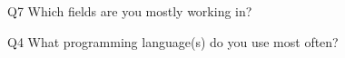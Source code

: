 \begin{description}%
\item{Q7} Which fields are you mostly working in?%
\item{Q4} What programming language(s) do you use most often?%
\end{description}%
